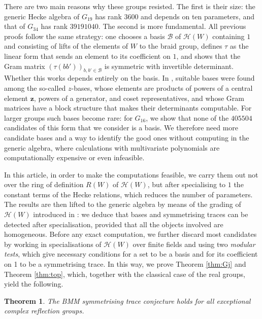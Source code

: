 \documentclass[11pt, reqno]{amsart}
\numberwithin{equation}{section}
\newtheorem{theorem}{Theorem}[section]
\theoremstyle{remark}
\begin{document}
There are two main reasons why these groups resisted.
The first is
their size: the generic Hecke algebra of $G_{19}$ has rank $3600$ and
depends on ten parameters, and that of $G_{34}$ has rank $39191040$.
The second is more fundamental. All previous proofs follow the same
strategy: one chooses a basis $\mathcal B$ of $\mathcal H(W)$
containing $1$ and consisting of lifts of the elements of $W$ to the
braid group, defines $\tau$ as the linear form that sends an element to
its coefficient on $1$, and shows that the Gram matrix
$(\tau(bb'))_{b,b'\in\mathcal B}$ is symmetric with invertible
determinant. Whether this works depends entirely on the basis. 
In \cite{ChPf}, suitable bases were found among the so-called $z$-bases,
whose elements are products of powers of a central element
$\mathbf z$, powers of a generator, and coset representatives, and
whose Gram matrices have a block structure that makes their
determinants computable. For larger groups such bases become rare: for
$G_{16}$, we show that none of the $405504$ candidates of this form
that we consider is a basis. We therefore need more candidate bases and a way to identify the good ones without computing in the generic algebra, where calculations with multivariate polynomials are computationally expensive or even infeasible.

In this article, in order to make the computations feasible, we carry them out not over the ring of
definition $R(W)$ of $\mathcal H(W)$, but after specialising to $1$ the
constant terms of the Hecke relations, which reduces the number of
parameters. The results are then lifted to the generic algebra by means
of the grading of $\mathcal H(W)$ introduced in \cite{BMM}: we deduce
that bases and symmetrising traces can be detected after
specialisation, provided that all the objects involved are homogeneous.
Before any exact computation, we further discard most
candidates by working in specialisations of $\mathcal H(W)$ over finite fields  and using two \emph{modular tests}, which give necessary conditions for a set to be a basis and for its coefficient on 1 to be a symmetrising trace.
In this way, we prove  Theorem \ref{thm:Gj} and Theorem \ref{thm:top}, which, together with the classical case of the real groups, yield the following.

\begin{theorem}\label{thm:main}
	The BMM symmetrising trace conjecture holds for all exceptional complex
	reflection groups.
\end{theorem}
\end{document}
